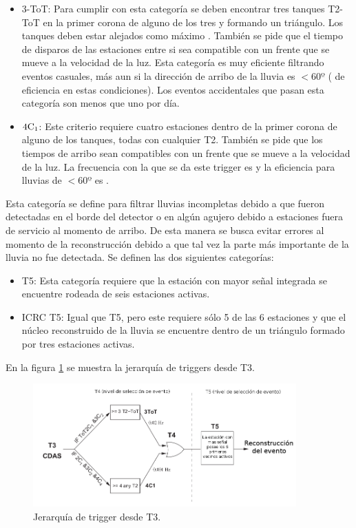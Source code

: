 			\begin{itemize}
			\item 3-ToT: Para cumplir con esta categor\'ia se deben encontrar tres tanques T2-ToT en la primer corona de alguno de los tres y formando un tri\'angulo. Los tanques deben estar alejados como m\'aximo . Tambi\'en se pide que el tiempo de disparos de las estaciones entre si sea compatible con un frente que se mueve a la velocidad de la luz. Esta categor\'ia es muy eficiente filtrando eventos casuales, m\'as aun si la direcci\'on de arribo de la lluvia es $<60º$ ( de eficiencia en estas condiciones). Los eventos accidentales que pasan esta categor\'ia son menos que uno por d\'ia.
			\item $\rm 4C_1$: Este criterio requiere cuatro estaciones dentro de la primer corona de alguno de los tanques, todas con cualquier T2. Tambi\'en se pide que los tiempos de arribo sean compatibles con un frente que se mueve a la velocidad de la luz. La frecuencia con la que se da este trigger es  y la eficiencia para lluvias de $<60º$ es .
			\end{itemize}
			\vspace{0.5cm}
			
			 Esta categor\'ia se define para filtrar lluvias incompletas debido a que fueron detectadas en el borde del detector o en alg\'un agujero debido a estaciones fuera de servicio al momento de arribo.
			De esta manera se busca evitar errores al momento de la reconstrucci\'on debido a que tal vez la parte m\'as importante de la lluvia no fue detectada.
			Se definen las dos siguientes categor\'ias:
			
			\begin{itemize}
			\item T5: Esta categor\'ia requiere que la estaci\'on con mayor se\~nal integrada se encuentre rodeada de seis estaciones activas.
			\item ICRC T5: Igual que T5, pero este requiere s\'olo 5 de las 6 estaciones y que el n\'ucleo reconstruido de la lluvia se encuentre dentro de un tri\'angulo formado por tres estaciones activas.
			\end{itemize}
			
			En la figura \ref{fig:diagtrig2} se muestra la jerarqu\'ia de triggers desde T3.
			
			\begin{figure}[h!]
				\begin{center}
				\includegraphics[width=0.9\textwidth]{fig/detectorAuger/Trigger_3}
				\caption{\label{fig:diagtrig2} Jerarqu\'ia de trigger desde T3.}
				\end{center}
			\end{figure}
